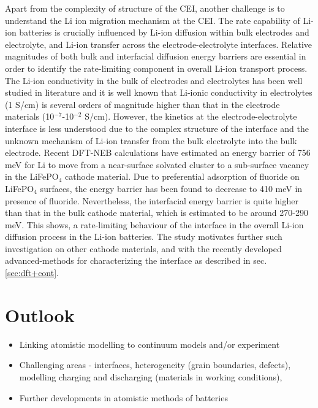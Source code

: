 \documentclass[journal=jacsat,manuscript=article]{achemso}
\begin{document}
Apart from the complexity of structure of the CEI, another challenge is to understand the Li ion migration mechanism at the CEI. The rate capability of Li-ion batteries is crucially influenced by Li-ion diffusion within bulk electrodes and electrolyte, and Li-ion transfer across the electrode-electrolyte interfaces. Relative magnitudes of both bulk and interfacial diffusion energy barriers are essential in order to identify the rate-limiting component in overall Li-ion transport process. The Li-ion conductivity in the bulk of electrodes and electrolytes has been well studied in literature and it is well known that Li-ionic conductivity in electrolytes (1 S/cm) is several orders of magnitude higher than that in the electrode materials (10$^{-7}$-10$^{-2}$ S/cm).\cite{Park2010, VanDerVen2013} However, the kinetics at the electrode-electrolyte interface is less understood due to the complex structure of the interface and the unknown mechanism of Li-ion transfer from the bulk electrolyte into the bulk electrode. Recent DFT-NEB calculations have estimated an energy barrier of 756 meV for Li to move from a near-surface solvated cluster to a sub-surface vacancy in the LiFePO$_4$ cathode material.\cite{Bhandari2019} Due to preferential adsorption of fluoride on LiFePO$_4$ surfaces,\cite{Edstrom2004, Bhandari2020} the energy barrier has been found to decrease to 410 meV in presence of fluoride. Nevertheless, the interfacial energy barrier is quite higher than that in the bulk cathode material, which is estimated to be around 270-290 meV.\cite{Morgan2004,Dathar2011} This shows, a rate-limiting behaviour of the interface in the overall Li-ion diffusion process in the Li-ion batteries. The study motivates further such investigation on other cathode materials, and with the recently developed advanced-methods for characterizing the interface as described in sec. \ref{sec:dft+cont}.   

\section{Outlook}
\begin{itemize}
    \item Linking atomistic modelling to continuum models and/or experiment
    \item Challenging areas - interfaces, heterogeneity (grain boundaries, defects), modelling charging and discharging (materials in working conditions), 
    \item Further developments in atomistic methods of batteries
\end{itemize}
\end{document}
